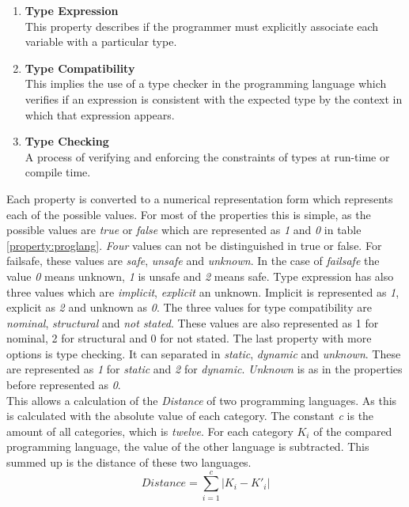 \begin{enumerate}
	\item \textbf{Type Expression}\\ This property describes if the programmer must explicitly associate each variable with a particular type.
	\item \textbf{Type Compatibility}\\ This implies the use of a type checker in the programming language which verifies if an expression is consistent with the expected type by the context in which that expression appears.
	\item \textbf{Type Checking}\\ A process of verifying and enforcing the constraints of types at run-time or compile time.\\
\end{enumerate}
Each property is converted to a numerical representation form which represents each of the possible values. For most of the properties this is simple, as the possible values are \textit{true} or \textit{false} which are represented as \textit{1} and \textit{0} in table \ref{property:proglang}. \textit{Four} values can not be distinguished in true or false. For failsafe, these values are \textit{safe}, \textit{unsafe} and \textit{unknown}. In the case of \textit{failsafe} the value \textit{0} means unknown, \textit{1} is unsafe and \textit{2} means safe. Type expression has also three values which are \textit{implicit}, \textit{explicit} an unknown. Implicit is represented as \textit{1}, explicit as \textit{2} and unknown as \textit{0}. The three values for type compatibility are \textit{nominal}, \textit{structural} and \textit{not stated}. These values are also represented as 1 for nominal, 2 for structural and 0 for not stated. The last property with more options is type checking. It can separated in \textit{static}, \textit{dynamic} and \textit{unknown}. These are represented as \textit{1} for \textit{static} and \textit{2} for \textit{dynamic}. \textit{Unknown} is as in the properties before represented as \textit{0}.\\
This allows a calculation of the \textit{Distance} of two programming languages. As this is calculated with the absolute value of each category. The constant \textit{c} is the amount of all categories, which is \textit{twelve}. For each category \textit{$K_i$} of the compared programming language, the value of the other language is subtracted. This summed up is the distance of these two languages.
\begin{equation}
\textit{Distance} = \sum \limits_{i=1}^c \lvert K_i - K'_i\rvert \label{pl:distanceequation}
\end{equation}
